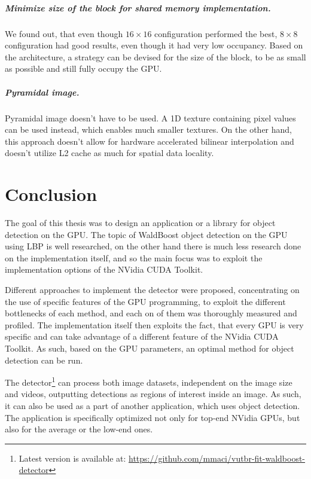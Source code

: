 \paragraph{Minimize size of the block for shared memory implementation.} We found out, that even though $16 \times 16$ configuration performed the best, $8 \times 8$ configuration had good results, even though it had very low occupancy. Based on the architecture, a strategy can be devised for the size of the block, to be as small as possible and still fully occupy the GPU.

\paragraph{Pyramidal image.} Pyramidal image doesn't have to be used. A 1D texture containing pixel values can be used instead, which enables much smaller textures. On the other hand, this approach doesn't allow for hardware accelerated bilinear interpolation and doesn't utilize L2 cache as much for spatial data locality.


\chapter{Conclusion}

The goal of this thesis was to design an application or a library for object detection on the GPU. The topic of WaldBoost object detection on the GPU using LBP is well researched, on the other hand there is much less research done on the implementation itself, and so the main focus was to exploit the implementation options of the NVidia CUDA Toolkit.

Different approaches to implement the detector were proposed, concentrating on the use of specific features of the GPU programming, to exploit the different bottlenecks of each method, and each on of them was thoroughly measured and profiled. The implementation itself then exploits the fact, that every GPU is very specific and can take advantage of a different feature of the NVidia CUDA Toolkit. As such, based on the GPU parameters, an optimal method for object detection can be run.

The detector\footnote{Latest version is available at: \url{https://github.com/mmaci/vutbr-fit-waldboost-detector}} can process both image datasets, independent on the image size and videos, outputting detections as regions of interest inside an image. As such, it can also be used as a part of another application, which uses object detection. The application is specifically optimized not only for top-end NVidia GPUs, but also for the average or the low-end ones.



\nocite{freund1997}
\nocite{lindholm2008nvidia}
\nocite{owens2007survey}	
\nocite{zemcik2013high}
\nocite{warps-occupancy}
\nocite{memory-coalescing}
\nocite{gpu-opt-fundamentals}